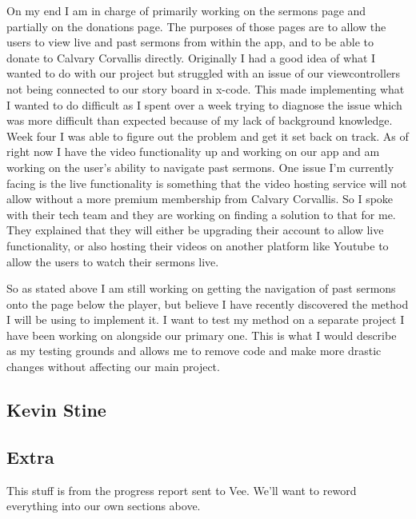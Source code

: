 \documentclass[letterpaper,10pt,draftclsnofoot,onecolumn,titlepage]{IEEEtran}
\begin{document}
On my end I am in charge of primarily working on the sermons page and partially on the donations page. 
The purposes of those pages are to allow the users to view live and past sermons from within the app, and to be able to donate to Calvary Corvallis directly. 
Originally I had a good idea of what I wanted to do with our project but struggled with an issue of our viewcontrollers not being connected to our story board in x-code. 
This made implementing what I wanted to do difficult as I spent over a week trying to diagnose the issue which was more difficult than expected because of my lack of background knowledge.  
Week four I was able to figure out the problem and get it set back on track. 
As of right now I have the video functionality up and working on our app and am working on the user’s ability to navigate past sermons. 
One issue I’m currently facing is the live functionality is something that the video hosting service will not allow without a more premium membership from Calvary Corvallis. 
So I spoke with their tech team and they are working on finding a solution to that for me. 
They explained that they will either be upgrading their account to allow live functionality, or also hosting their videos on another platform like Youtube to allow the users to watch their sermons live. 

So as stated above I am still working on getting the navigation of past sermons onto the page below the player, but believe I have recently discovered the method I will be using to implement it. 
I want to test my method on a separate project I have been working on alongside our primary one. 
This is what I would describe as my testing grounds and allows me to remove code and make more drastic changes without affecting our main project. 

	
	
	\subsection{Kevin Stine}
	
	
	
	\subsection{Extra}
	
	This stuff is from the progress report sent to Vee. We'll want to reword everything into our own sections above. 
	
\end{document}

